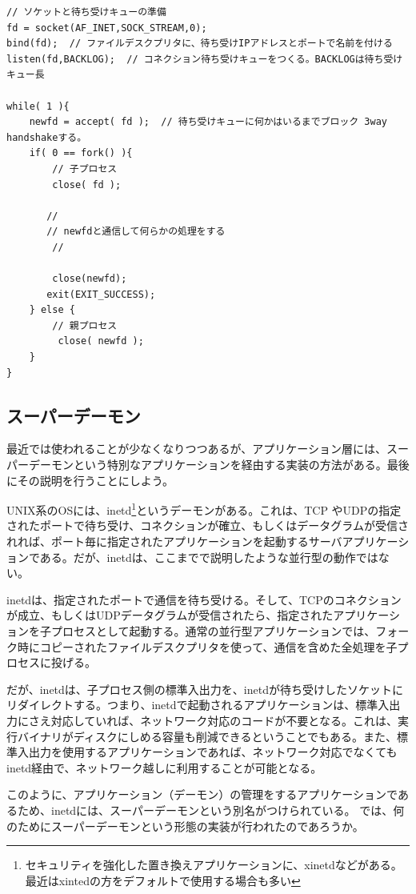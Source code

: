 {\scriptsize
\begin{verbatim}
// ソケットと待ち受けキューの準備
fd = socket(AF_INET,SOCK_STREAM,0);
bind(fd);  // ファイルデスクプリタに、待ち受けIPアドレスとポートで名前を付ける
listen(fd,BACKLOG);  // コネクション待ち受けキューをつくる。BACKLOGは待ち受けキュー長

while( 1 ){
    newfd = accept( fd );  // 待ち受けキューに何かはいるまでブロック 3way handshakeする。
    if( 0 == fork() ){
        // 子プロセス
        close( fd );

       //
       // newfdと通信して何らかの処理をする
        //

        close(newfd);
       exit(EXIT_SUCCESS);
    } else {
        // 親プロセス
         close( newfd );
    }
}
\end{verbatim}
}


\subsection{スーパーデーモン}

最近では使われることが少なくなりつつあるが、アプリケーション層には、スーパーデーモンという特別なアプリケーションを経由する実装の方法がある。最後にその説明を行うことにしよう。

UNIX系のOSには、inetd\footnote{セキュリティを強化した置き換えアプリケーションに、xinetdなどがある。最近はxintedの方をデフォルトで使用する場合も多い}というデーモンがある。これは、TCP やUDPの指定されたポートで待ち受け、コネクションが確立、もしくはデータグラムが受信されれば、ポート毎に指定されたアプリケーションを起動するサーバアプリケーションである。だが、inetdは、ここまでで説明したような並行型の動作ではない。

inetdは、指定されたポートで通信を待ち受ける。そして、TCPのコネクションが成立、もしくはUDPデータグラムが受信されたら、指定されたアプリケーションを子プロセスとして起動する。通常の並行型アプリケーションでは、フォーク時にコピーされたファイルデスクプリタを使って、通信を含めた全処理を子プロセスに投げる。

だが、inetdは、子プロセス側の標準入出力を、inetdが待ち受けしたソケットにリダイレクトする。つまり、inetdで起動されるアプリケーションは、標準入出力にさえ対応していれば、ネットワーク対応のコードが不要となる。これは、実行バイナリがディスクにしめる容量も削減できるということでもある。また、標準入出力を使用するアプリケーションであれば、ネットワーク対応でなくてもinetd経由で、ネットワーク越しに利用することが可能となる。

このように、アプリケーション（デーモン）の管理をするアプリケーションであるため、inetdには、スーパーデーモンという別名がつけられている。
では、何のためにスーパーデーモンという形態の実装が行われたのであろうか。

